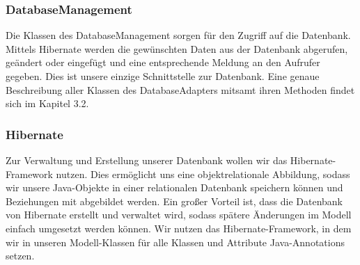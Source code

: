 	\subsubsection{DatabaseManagement}
	Die Klassen des DatabaseManagement sorgen für den Zugriff auf die Datenbank.
	Mittels Hibernate werden die gewünschten Daten aus der Datenbank abgerufen, geändert oder eingefügt und eine entsprechende Meldung an den Aufrufer gegeben.
	Dies ist unsere einzige Schnittstelle zur Datenbank.	
	Eine genaue Beschreibung aller Klassen des DatabaseAdapters mitsamt ihren Methoden findet sich im Kapitel 3.2.

\begin {center}
\end {center}


	\subsubsection{Hibernate}
	Zur Verwaltung und Erstellung unserer Datenbank wollen wir das Hibernate-Framework nutzen. 
	Dies ermöglicht uns eine objektrelationale Abbildung, sodass wir unsere Java-Objekte in einer relationalen Datenbank speichern können und Beziehungen mit abgebildet werden.
	Ein großer Vorteil ist, dass die Datenbank von Hibernate erstellt und verwaltet wird, sodass spätere Änderungen im Modell einfach umgesetzt werden können.
	Wir nutzen das Hibernate-Framework, in dem wir in unseren Modell-Klassen für alle Klassen und Attribute Java-Annotations setzen.
	

